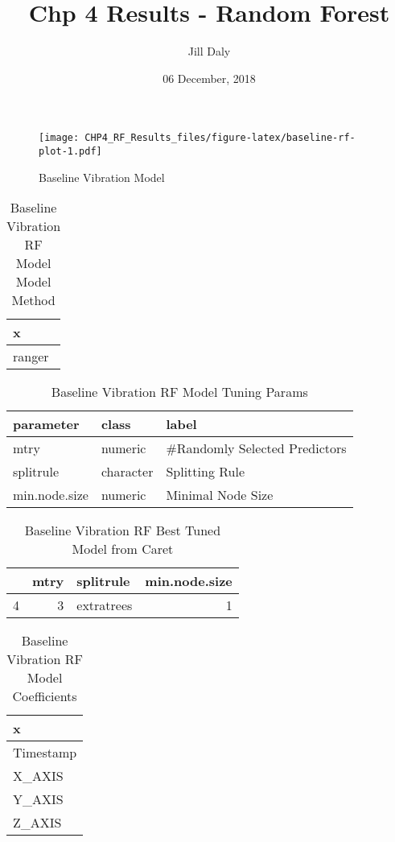 \documentclass[]{article}
\title{Chp 4 Results - Random Forest}
\author{Jill Daly}
\date{06 December, 2018}
\begin{document}
\maketitle

\begin{figure}
\centering
\texttt{[image: CHP4\_RF\_Results\_files/figure-latex/baseline-rf-plot-1.pdf]}
\caption{Baseline Vibration Model}
\end{figure}

\begin{table}[!h]

\caption{\label{tab:baseline-rf-params}Baseline Vibration RF Model Model Method}
\centering
\begin{tabular}[t]{l}
\toprule
x\\
\midrule
ranger\\
\bottomrule
\end{tabular}
\end{table}

\begin{table}[!h]

\caption{\label{tab:baseline-rf-params}Baseline Vibration RF Model Tuning Params}
\centering
\begin{tabular}[t]{lll}
\toprule
parameter & class & label\\
\midrule
mtry & numeric & \#Randomly Selected Predictors\\
splitrule & character & Splitting Rule\\
min.node.size & numeric & Minimal Node Size\\
\bottomrule
\end{tabular}
\end{table}

\begin{table}[!h]

\caption{\label{tab:baseline-rf-params}Baseline Vibration RF Best Tuned Model from Caret}
\centering
\begin{tabular}[t]{lrlr}
\toprule
  & mtry & splitrule & min.node.size\\
\midrule
4 & 3 & extratrees & 1\\
\bottomrule
\end{tabular}
\end{table}

\begin{table}[!h]

\caption{\label{tab:baseline-rf-params}Baseline Vibration RF Model Coefficients}
\centering
\begin{tabular}[t]{l}
\toprule
x\\
\midrule
Timestamp\\
X\_AXIS\\
Y\_AXIS\\
Z\_AXIS\\
\bottomrule
\end{tabular}
\end{table}
\end{document}

